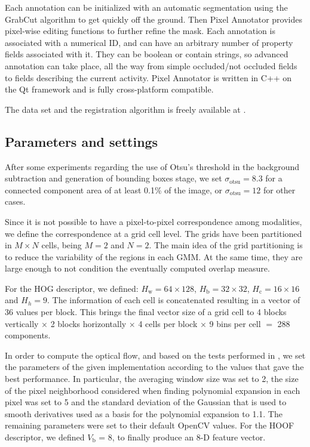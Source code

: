\documentclass[10pt,twocolumn,letterpaper]{article}
\begin{document}
Each annotation can be initialized with an automatic segmentation using the GrabCut algorithm \cite{rother2004grabcut} to get quickly off the ground. Then Pixel Annotator provides pixel-wise editing functions to further refine the mask. Each annotation is associated with a numerical ID, and can have an arbitrary number of property fields associated with it. They can be boolean or contain strings, so advanced annotation can take place, all the way from simple occluded/not occluded fields to fields describing the current activity. Pixel Annotator is written in C++ on the Qt framework and is fully cross-platform compatible.

The data set and the registration algorithm is freely available at \cite{vapgroup}.

\subsection{Parameters and settings}
\label{ssec:parametersandsettings}

After some experiments regarding the use of Otsu's threshold in the background subtraction and generation of bounding boxes stage, we set $\sigma_\text{otsu} = 8.3$ for a connected component area of at least 0.1\% of the image, or  $\sigma_\text{otsu} = 12$ for other cases.

Since it is not possible to have a pixel-to-pixel correspondence among modalities, we define the correspondence at a grid cell level. The grids have been partitioned in $M \times N$ cells, being $M = 2$ and $N = 2$. The main idea of the grid partitioning is to reduce the variability of the regions in each GMM. At the same time, they are large enough to not condition the eventually computed overlap measure.

For the HOG descriptor, we defined: $H_\text{w} = 64 \times 128$, $H_\text{b} = 32 \times 32$, $H_\text{c}=16 \times 16$ and $H_{h} = 9$. The information of each cell is concatenated resulting in a vector of 36 values per block. This brings the final vector size of a grid cell to 4 blocks vertically $\times$ 2 blocks horizontally $\times$ 4 cells per block $\times$ 9 bins per cell $=$ 288 components. 

In order to compute the optical flow, and based on the tests performed in \cite{brkic2013combining}, we set the parameters of the given implementation according to the values that gave the best performance. In particular, the averaging window size was set to 2, the size of the pixel neighborhood considered when finding polynomial expansion in each pixel was set to 5 and the standard deviation of the Gaussian that is used to smooth derivatives used as a basis for the polynomial expansion to 1.1.  The remaining parameters were set to their default OpenCV values. For the HOOF descriptor, we defined $V_\text{b}$ = 8, to finally produce an 8-D feature vector.
\end{document}
